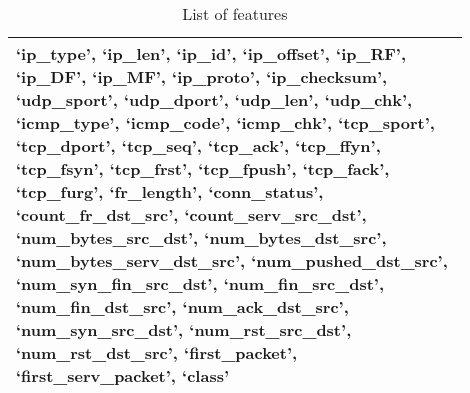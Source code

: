 \begin{table}[!htb]
    \centering
    \caption{List of features}
    \label{table-featurelist}
    \begin{tabular}{>{\centering\arraybackslash}p{0.9\linewidth}}
    \toprule
 `ip\_type', `ip\_len', `ip\_id', `ip\_offset', `ip\_RF', `ip\_DF', `ip\_MF', `ip\_proto', `ip\_checksum', `udp\_sport', `udp\_dport', `udp\_len', `udp\_chk', `icmp\_type', `icmp\_code', `icmp\_chk', `tcp\_sport', `tcp\_dport', `tcp\_seq', `tcp\_ack', `tcp\_ffyn', `tcp\_fsyn', `tcp\_frst', `tcp\_fpush', `tcp\_fack', `tcp\_furg', `fr\_length', `conn\_status', `count\_fr\_dst\_src', `count\_serv\_src\_dst', `num\_bytes\_src\_dst', `num\_bytes\_dst\_src', `num\_bytes\_serv\_dst\_src', `num\_pushed\_dst\_src', `num\_syn\_fin\_src\_dst', `num\_fin\_src\_dst', `num\_fin\_dst\_src', `num\_ack\_dst\_src', `num\_syn\_src\_dst', `num\_rst\_src\_dst', `num\_rst\_dst\_src', `first\_packet', `first\_serv\_packet', `class'\\
 \bottomrule
    \end{tabular}
\end{table}

